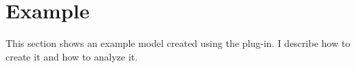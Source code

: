 \section{Example}
This section shows an example model created using the plug-in. I describe
how to create it and how to analyze it.